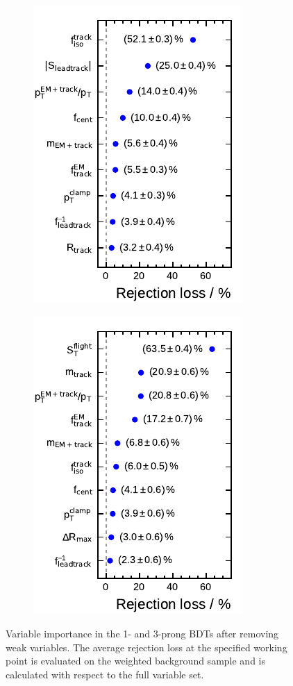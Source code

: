 \begin{figure}[htb]
  \centering
  \begin{subfigure}[t]{0.48\textwidth}
    \centering
    \includegraphics{./figures/bdt_perf/var_importance/1p_iter2.pdf}
  \end{subfigure}\hfill
  \begin{subfigure}[t]{0.48\textwidth}
    \centering
    \includegraphics{./figures/bdt_perf/var_importance/3p_iter3.pdf}
  \end{subfigure}
  \caption{Variable importance in the 1- and 3-prong BDTs after removing weak
    variables. The average rejection loss at the specified working point is
    evaluated on the weighted background sample and is calculated with respect
    to the full variable set.}
  \label{fig:variable_importance_final}
\end{figure}

